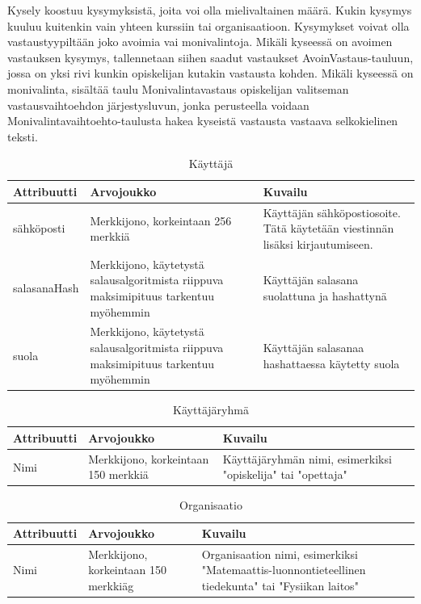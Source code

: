 \documentclass[12pt,a4paper,titlepage]{article}
\begin{document}
Kysely koostuu kysymyksistä, joita voi olla mielivaltainen määrä. Kukin kysymys kuuluu kuitenkin vain yhteen kurssiin tai organisaatioon. Kysymykset voivat olla vastaustyypiltään joko avoimia vai monivalintoja. Mikäli kyseessä on avoimen vastauksen kysymys, tallennetaan siihen saadut vastaukset AvoinVastaus-tauluun, jossa on yksi rivi kunkin opiskelijan kutakin vastausta kohden. Mikäli kyseessä on monivalinta, sisältää taulu Monivalintavastaus opiskelijan valitseman vastausvaihtoehdon järjestysluvun, jonka perusteella voidaan Monivalintavaihtoehto-taulusta hakea kyseistä vastausta vastaava selkokielinen teksti.


\begin{table}[h]
\caption{Käyttäjä} \label{tietokohde_ensimmainen}
\begin{tabularx}{\textwidth}{ | l X X |}
  \hline
  Attribuutti & Arvojoukko & Kuvailu \\
  \hline
  sähköposti & Merkkijono, korkeintaan 256 merkkiä & Käyttäjän sähköpostiosoite. Tätä käytetään viestinnän lisäksi kirjautumiseen. \\
  salasanaHash & Merkkijono, käytetystä salausalgoritmista riippuva maksimipituus tarkentuu myöhemmin & Käyttäjän salasana suolattuna ja hashattynä\\
  suola & Merkkijono, käytetystä salausalgoritmista riippuva maksimipituus tarkentuu myöhemmin & Käyttäjän salasanaa hashattaessa käytetty suola \\
  \hline
\end{tabularx}
\end{table}

\begin{table}[h]
\caption{Käyttäjäryhmä}
\begin{tabularx}{\textwidth}{|  l X X  |}
  \hline
  Attribuutti & Arvojoukko & Kuvailu \\
  \hline
   Nimi & Merkkijono, korkeintaan 150 merkkiä & Käyttäjäryhmän nimi, esimerkiksi "opiskelija" tai "opettaja" \\
  \hline
\end{tabularx}
\end{table}

\begin{table}[h]
\caption{Organisaatio}
\begin{tabularx}{\textwidth}{ |  l X X  |}
  \hline
  Attribuutti & Arvojoukko & Kuvailu \\
  \hline
  Nimi & Merkkijono, korkeintaan 150 merkkiäg & Organisaation nimi, esimerkiksi "Matemaattis-luonnontieteellinen tiedekunta" tai "Fysiikan laitos" \\
  \hline
\end{tabularx}
\end{table}
\end{document}
